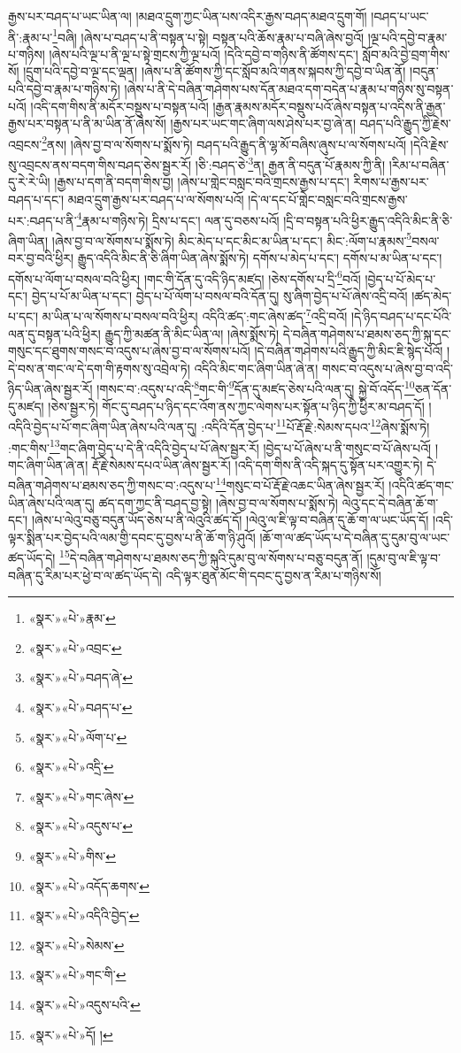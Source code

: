 རྒྱས་པར་བཤད་པ་ཡང་ཡིན་ལ། །མཐའ་དྲུག་ཀྱང་ཡིན་པས་འདིར་རྒྱས་བཤད་མཐའ་དྲུག་གོ། །བཤད་པ་ཡང་ནི་:རྣམ་པ་\footnote{«སྣར་»«པེ་»རྣམ་}བཞི། །ཞེས་པ་བཤད་པ་ནི་བསྟན་པ་སྟེ། བསྟན་པའི་ཆོས་རྣམ་པ་བཞི་ཞེས་བྱའོ། །ལྔ་པའི་དབྱེ་བ་རྣམ་པ་གཉིས། །ཞེས་པའི་ལྔ་པ་ནི་ལྔ་པ་སྟེ་གྲངས་ཀྱི་ལྔ་པའོ། །དེའི་དབྱེ་བ་གཉིས་ནི་ཚོགས་དང་། སློབ་མའི་བྱེ་བྲག་གིས་སོ། །དྲུག་པའི་དབྱེ་བ་ལྔ་དང་ལྡན། །ཞེས་པ་ནི་ཚོགས་ཀྱི་དང་སློབ་མའི་གནས་སྐབས་ཀྱི་དབྱེ་བ་ཡིན་ནོ། །བདུན་པའི་དབྱེ་བ་རྣམ་པ་གཉིས་ཏེ། །ཞེས་པ་ནི་དེ་བཞིན་གཤེགས་པས་དོན་མཐའ་དག་བདེན་པ་རྣམ་པ་གཉིས་སུ་བསྟན་པའོ། །འདི་དག་གིས་ནི་མདོར་བསྡུས་པ་བསྟན་པའོ། །རྒྱན་རྣམས་མདོར་བསྡུས་པའོ་ཞེས་བསྟན་པ་འདིས་ནི་རྒྱན་རྒྱས་པར་བསྟན་པ་ནི་མ་ཡིན་ནོ་ཞེས་སོ། །རྒྱས་པར་ཡང་གང་ཞིག་ལས་ཤེས་པར་བྱ་ཞེ་ན། བཤད་པའི་རྒྱུད་ཀྱི་རྗེས་འབྲངས་\footnote{«སྣར་»«པེ་»འབྲང་}ནས། །ཞེས་བྱ་བ་ལ་སོགས་པ་སྨོས་ཏེ། བཤད་པའི་རྒྱུད་ནི་ལྷ་མོ་བཞིས་ཞུས་པ་ལ་སོགས་པའོ། །དེའི་རྗེས་སུ་འབྲངས་ནས་བདག་གིས་བཤད་ཅེས་སྦྱར་རོ། །ཅི་:བཤད་ཅེ་\footnote{«སྣར་»«པེ་»བཤད་ཞེ་}ན། རྒྱན་ནི་བདུན་པོ་རྣམས་ཀྱི་ནི། །རིམ་པ་བཞིན་དུ་རེ་རེ་ཡི། །རྒྱས་པ་དག་ནི་བདག་གིས་བྱ། །ཞེས་པ་གླེང་བསླང་བའི་གྲངས་རྒྱས་པ་དང་། རིགས་པ་རྒྱས་པར་བཤད་པ་དང་། མཐའ་དྲུག་རྒྱས་པར་བཤད་པ་ལ་སོགས་པའོ། །དེ་ལ་དང་པོ་གླེང་བསླང་བའི་གྲངས་རྒྱས་པར་:བཤད་པ་ནི་\footnote{«སྣར་»«པེ་»བཤད་པ་}རྣམ་པ་གཉིས་ཏེ། དྲིས་པ་དང་། ལན་དུ་བཅས་པའོ། །དྲི་བ་བསྟན་པའི་ཕྱིར་རྒྱུད་འདིའི་མིང་ནི་ཅི་ཞིག་ཡིན། །ཞེས་བྱ་བ་ལ་སོགས་པ་སྨོས་ཏེ། མིང་མེད་པ་དང་མིང་མ་ཡིན་པ་དང་། མིང་:ལོག་པ་རྣམས་\footnote{«སྣར་»«པེ་»ལོག་པ་}བསལ་བར་བྱ་བའི་ཕྱིར། རྒྱུད་འདིའི་མིང་ནི་ཅི་ཞིག་ཡིན་ཞེས་སྨོས་ཏེ། དགོས་པ་མེད་པ་དང་། དགོས་པ་མ་ཡིན་པ་དང་། དགོས་པ་ལོག་པ་བསལ་བའི་ཕྱིར། །གང་གི་དོན་དུ་འདི་ཉིད་མཛད། །ཅེས་དགོས་པ་དྲི་\footnote{«སྣར་»«པེ་»འདྲི་}བའོ། །བྱེད་པ་པོ་མེད་པ་དང་། བྱེད་པ་པོ་མ་ཡིན་པ་དང་། བྱེད་པ་པོ་ལོག་པ་བསལ་བའི་དོན་དུ། སུ་ཞིག་བྱེད་པ་པོ་ཞེས་འདྲི་བའོ། །ཚད་མེད་པ་དང་། མ་ཡིན་པ་ལ་སོགས་པ་བསལ་བའི་ཕྱིར། འདིའི་ཚད་:གང་ཞེས་ཚད་\footnote{«སྣར་»«པེ་»གང་ཞེས་}འདྲི་བའོ། །དེ་ཉིད་བཤད་པ་དང་པོའི་ལན་དུ་བསྟན་པའི་ཕྱིར། རྒྱུད་ཀྱི་མཚན་ནི་མིང་ཡིན་ལ། །ཞེས་སྨོས་ཏེ། དེ་བཞིན་གཤེགས་པ་ཐམས་ཅད་ཀྱི་སྐུ་དང་གསུང་དང་ཐུགས་གསང་བ་འདུས་པ་ཞེས་བྱ་བ་ལ་སོགས་པའོ། །དེ་བཞིན་གཤེགས་པའི་རྒྱུད་ཀྱི་མིང་ཇི་སྙེད་པའོ། །དེ་བས་ན་གང་ལ་དེ་དག་གི་རྟགས་སུ་འབྲེལ་ཏེ། འདིའི་མིང་གང་ཞིག་ཡིན་ཞེ་ན། གསང་བ་འདུས་པ་ཞེས་བྱ་བ་འདི་ཉིད་ཡིན་ཞེས་སྦྱར་རོ། །གསང་བ་:འདུས་པ་འདི་\footnote{«སྣར་»«པེ་»འདུས་པ་}གང་གི་\footnote{«སྣར་»«པེ་»གིས་}དོན་དུ་མཛད་ཅེས་པའི་ལན་དུ། སྐྱེ་བོ་འདོད་\footnote{«སྣར་»«པེ་»འདོད་ཆགས་}ཅན་དོན་དུ་མཛད། །ཅེས་སྦྱར་ཏེ། གོང་དུ་བཤད་པ་ཉིད་དང་འོག་ནས་ཀྱང་ལེགས་པར་སྟོན་པ་ཉིད་ཀྱི་ཕྱིར་མ་བཤད་དོ། །འདིའི་བྱེད་པ་པོ་གང་ཞིག་ཡིན་ཞེས་པའི་ལན་དུ། :འདིའི་དོན་བྱེད་པ་\footnote{«སྣར་»«པེ་»འདིའི་བྱེད་}པོ་རྡོ་རྗེ་:སེམས་དཔའ་\footnote{«སྣར་»«པེ་»སེམས་}ཞེས་སྨོས་ཏེ། :གང་གིས་\footnote{«སྣར་»«པེ་»གང་གི་}གང་ཞིག་བྱེད་པ་དེ་ནི་འདིའི་བྱེད་པ་པོ་ཞེས་སྦྱར་རོ། །བྱེད་པ་པོ་ཞེས་པ་ནི་གསུང་བ་པོ་ཞེས་པའོ། །གང་ཞིག་ཡིན་ཞེ་ན། རྡོ་རྗེ་སེམས་དཔའ་ཡིན་ཞེས་སྦྱར་རོ། །འདི་དག་གིས་ནི་འདི་སྐད་དུ་སྟོན་པར་འགྱུར་ཏེ། དེ་བཞིན་གཤེགས་པ་ཐམས་ཅད་ཀྱི་གསང་བ་:འདུས་པ་\footnote{«སྣར་»«པེ་»འདུས་པའི་}གསུང་བ་པོ་རྡོ་རྗེ་འཆང་ཡིན་ཞེས་སྦྱར་རོ། །འདིའི་ཚད་གང་ཡིན་ཞེས་པའི་ལན་དུ། ཚད་དག་ཀྱང་ནི་བཤད་བྱ་སྟེ། །ཞེས་བྱ་བ་ལ་སོགས་པ་སྨོས་ཏེ། ལེའུ་དང་དེ་བཞིན་ཆོ་ག་དང་། །ཞེས་པ་ལེའུ་བཅུ་བདུན་ཡོད་ཅེས་པ་ནི་ལེའུའི་ཚད་དོ། །ལེའུ་ལ་ཇི་ལྟ་བ་བཞིན་དུ་ཆོ་ག་ལ་ཡང་ཡོད་དོ། །འདི་ལྟར་སྨིན་པར་བྱེད་པའི་ལམ་གྱི་དབང་དུ་བྱས་པ་ནི་ཆོ་ག་ཉི་ཤུའོ། །ཆོ་ག་ལ་ཚད་ཡོད་པ་དེ་བཞིན་དུ་དུམ་བུ་ལ་ཡང་ཚད་ཡོད་དེ། \footnote{«སྣར་»«པེ་»དོ། ། }དེ་བཞིན་གཤེགས་པ་ཐམས་ཅད་ཀྱི་སྐུའི་དུམ་བུ་ལ་སོགས་པ་བཅུ་བདུན་ནོ། །དུམ་བུ་ལ་ཇི་ལྟ་བ་བཞིན་དུ་རིམ་པར་ཕྱེ་བ་ལ་ཚད་ཡོད་དེ། འདི་ལྟར་ཐུན་མོང་གི་དབང་དུ་བྱས་ན་རིམ་པ་གཉིས་སོ། 
